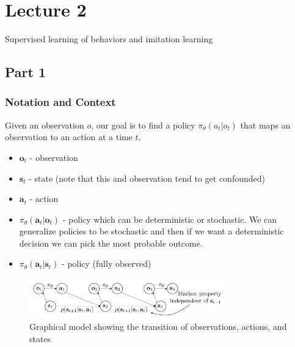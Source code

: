 \section{Lecture 2}
Supervised learning of behaviors and imitation learning
\subsection{Part 1}
\subsubsection{Notation and Context}
Given an observation $o$, our goal is to find a policy $\pi_\theta(a_t|o_t)$ that maps an observation to an action at a time $t$.
\begin{itemize}
    \item $\textbf{o}_t$ - observation
    \item $\textbf{s}_t$ - state (note that this and observation tend to get confounded)
    \item $\textbf{a}_t$ - action
    \item $\pi_\theta(\textbf{a}_t|\textbf{o}_t)$ - policy which can be deterministic or stochastic. We can generalize policies to be stochastic and then if we want a deterministic decision we can pick the most probable outcome.
    \item $\pi_\theta(\textbf{a}_t|\textbf{s}_t)$ - policy (fully observed)    
\end{itemize}

\begin{figure}[htbp]
  \centerline{\includegraphics[width=0.75\textwidth]{images/lecture2_grapical_depiction}}
  \caption{Graphical model showing the transition of observations, actions, and states}
  \label{fig:lecture2_grapical_depiction}
\end{figure}

